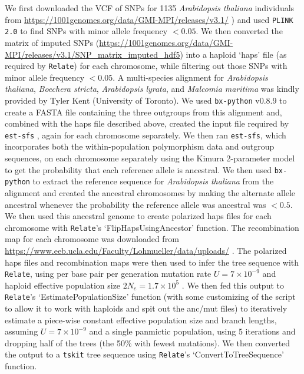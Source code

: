 \documentclass[12pt]{article}
\begin{document}
We first downloaded the VCF of SNPs for 1135 \textit{Arabidopsis thaliana} individuals from \url{https://1001genomes.org/data/GMI-MPI/releases/v3.1/} \citep{alonso2016}) and used \texttt{PLINK 2.0} \citep[\url{www.cog-genomics.org/plink/2.0/};][]{chang2015second} to find SNPs with minor allele frequency $<0.05$.
We then converted the matrix of imputed SNPs (\url{https://1001genomes.org/data/GMI-MPI/releases/v3.1/SNP_matrix_imputed_hdf5}) into a haploid `haps' file (as required by \texttt{Relate}) for each chromosome, while filtering out those SNPs with minor allele frequency $<0.05$.
A multi-species alignment for \textit{Arabidopsis thaliana}, \textit{Boechera stricta}, \textit{Arabidopsis lyrata}, and \textit{Malcomia maritima} was kindly provided by Tyler Kent (University of Toronto). 
We used \texttt{bx-python} v0.8.9 to create a FASTA file containing the three outgroups from this alignment and, combined with the haps file described above, created the input file required by \texttt{est-sfs} \citep{keightley2018inferring}, again for each chromosome separately.
We then ran \texttt{est-sfs}, which incorporates both the within-population polymorphism data and outgroup sequences, on each chromosome separately using the Kimura 2-parameter model \citep{kimura1980simple} to get the probability that each reference allele is ancestral.
We then used \texttt{bx-python} to extract the reference sequence for \textit{Arabidopsis thaliana} from the alignment and created the ancestral chromosomes by making the alternate allele ancestral whenever the probability the reference allele was ancestral was $<0.5$.
We then used this ancestral genome to create polarized haps files for each chromosome with \texttt{Relate}'s `FlipHapsUsingAncestor' function.
The recombination map for each chromosome was downloaded from \url{https://www.eeb.ucla.edu/Faculty/Lohmueller/data/uploads/} \citep{salome2012recombination}.
The polarized haps files and recombination maps were then used to infer the tree sequence with \texttt{Relate}, using per base pair per generation mutation rate $U=7\times10^{-9}$ \citep{10.7554/eLife.54967} and haploid effective population size $2N_e = 1.7\times10^5$ \citep[estimated from nucleotide diversity, $\pi = 4 N_e U$, calculated with \texttt{tskit} \texttt{diversity()} statistic;][]{ralph2020efficiently}.
We then fed this output to \texttt{Relate}'s `EstimatePopulationSize' function (with some customizing of the script to allow it to work with haploids and spit out the anc/mut files) to iteratively estimate a piece-wise constant effective population size and branch lengths, assuming $U=7\times10^{-9}$ and a single panmictic population, using 5 iterations and dropping half of the trees (the 50\% with fewest mutations). 
We then converted the output to a \texttt{tskit} tree sequence using \texttt{Relate}'s `ConvertToTreeSequence' function.
\end{document}
